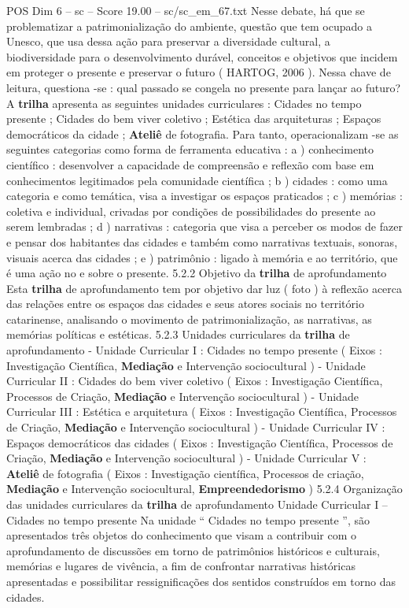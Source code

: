 \begin{textsample}{POS Dim 6 – sc – Score 19.00 – sc/sc\_em\_67.txt}
Nesse debate, há que se problematizar a patrimonialização do ambiente, questão que tem ocupado a Unesco, que usa dessa ação para preservar a diversidade cultural, a biodiversidade para o desenvolvimento durável, conceitos e objetivos que incidem em proteger o presente e preservar o futuro ( HARTOG, 2006 ).
Nessa chave de leitura, questiona -se : qual passado se congela no presente para lançar ao futuro?
A \textbf{trilha} apresenta as seguintes unidades curriculares : Cidades no tempo presente ; Cidades do bem viver coletivo ; Estética das arquiteturas ; Espaços democráticos da cidade ; \textbf{Ateliê} de fotografia.
Para tanto, operacionalizam -se as seguintes categorias como forma de ferramenta educativa : a ) conhecimento científico : desenvolver a capacidade de compreensão e reflexão com base em conhecimentos legitimados pela comunidade científica ; b ) cidades : como uma categoria e como temática, visa a investigar os espaços praticados ; c ) memórias : coletiva e individual, crivadas por condições de possibilidades do presente ao serem lembradas ; d ) narrativas : categoria que visa a perceber os modos de fazer e pensar dos habitantes das cidades e também como narrativas textuais, sonoras, visuais acerca das cidades ; e ) patrimônio : ligado à memória e ao território, que é uma ação no e sobre o presente. 5.2.2 Objetivo da \textbf{trilha} de aprofundamento Esta \textbf{trilha} de aprofundamento tem por objetivo dar luz ( foto ) à reflexão acerca das relações entre os espaços das cidades e seus atores sociais no território catarinense, analisando o movimento de patrimonialização, as narrativas, as memórias políticas e estéticas. 5.2.3 Unidades curriculares da \textbf{trilha} de aprofundamento - Unidade Curricular I : Cidades no tempo presente ( Eixos : Investigação Científica, \textbf{Mediação} e Intervenção sociocultural ) - Unidade Curricular II : Cidades do bem viver coletivo ( Eixos : Investigação Científica, Processos de Criação, \textbf{Mediação} e Intervenção sociocultural ) - Unidade Curricular III : Estética e arquitetura ( Eixos : Investigação Científica, Processos de Criação, \textbf{Mediação} e Intervenção sociocultural ) - Unidade Curricular IV : Espaços democráticos das cidades ( Eixos : Investigação Científica, Processos de Criação, \textbf{Mediação} e Intervenção sociocultural ) - Unidade Curricular V : \textbf{Ateliê} de fotografia ( Eixos : Investigação científica, Processos de criação, \textbf{Mediação} e Intervenção sociocultural, \textbf{Empreendedorismo} ) 5.2.4 Organização das unidades curriculares da \textbf{trilha} de aprofundamento Unidade Curricular I – Cidades no tempo presente Na unidade “ Cidades no tempo presente ”, são apresentados três objetos do conhecimento que visam a contribuir com o aprofundamento de discussões em torno de patrimônios históricos e culturais, memórias e lugares de vivência, a fim de confrontar narrativas históricas apresentadas e possibilitar ressignificações dos sentidos construídos em torno das cidades.

\end{textsample}
